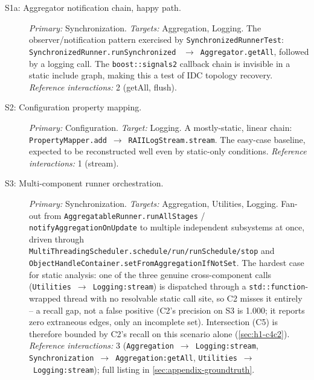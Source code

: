 \begin{description}
  \item[S1a: Aggregator notification chain, happy path.]
    \emph{Primary:} Synchronization. \emph{Targets:} Aggregation, Logging.
    The observer/notification pattern exercised by
    \texttt{SynchronizedRunnerTest}: \texttt{SynchronizedRunner.runSynchronized}
    ~$\to$~\texttt{Aggregator.getAll}, followed by a logging call. The
    \texttt{boost::signals2} callback chain is invisible in a static
    include graph, making this a test of IDC topology recovery.
    \emph{Reference interactions:} 2 (getAll, flush).

  \item[S2: Configuration property mapping.]
    \emph{Primary:} Configuration. \emph{Target:} Logging. A mostly-static,
    linear chain: \texttt{PropertyMapper.add}~$\to$~\texttt{RAIILogStream.stream}.
    The easy-case baseline, expected to be reconstructed well even by
    static-only conditions. \emph{Reference interactions:} 1 (stream).

  \item[S3: Multi-component runner orchestration.]
    \emph{Primary:} Synchronization. \emph{Targets:} Aggregation, Utilities,
    Logging. Fan-out from \texttt{AggregatableRunner.runAllStages} /
    \texttt{notifyAggregationOnUpdate} to multiple independent
    subsystems at once, driven through
    \texttt{MultiThreadingScheduler.schedule/run/runSchedule/stop} and
    \texttt{ObjectHandleContainer.setFromAggregationIfNotSet}. The
    hardest case for static analysis: one of the three genuine
    cross-component calls (\texttt{Utilities}~$\to$~\texttt{Logging:stream})
    is dispatched through a \texttt{std::function}-wrapped thread with
    no resolvable static call site, so C2 misses it entirely -- a
    recall gap, not a false positive (C2's precision on S3 is 1.000; it
    reports zero extraneous edges, only an incomplete set). Intersection
    (C5) is therefore bounded by C2's recall on this scenario alone
    (\cref{sec:h1-c4c2}). \emph{Reference interactions:} 3
    (\texttt{Aggregation}~$\to$~\texttt{Logging:stream},
    \texttt{Synchronization}~$\to$~\texttt{Aggregation:getAll},
    \texttt{Utilities}~$\to$~\texttt{Logging:stream}); full listing in
    \cref{sec:appendix-groundtruth}.


\end{description}
